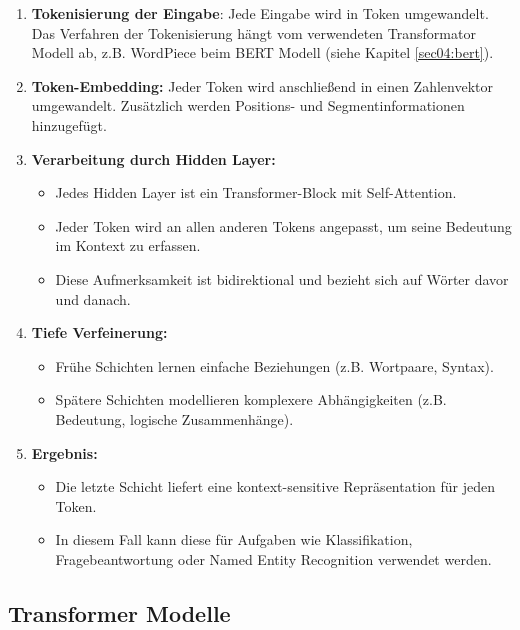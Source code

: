 \begin{enumerate}
    \item \textbf{Tokenisierung der Eingabe}: Jede Eingabe wird in Token umgewandelt. Das Verfahren der Tokenisierung hängt vom verwendeten Transformator Modell ab,
    z.B. WordPiece beim BERT Modell (siehe Kapitel \ref{sec04:bert}).

    \item \textbf{Token-Embedding:} Jeder Token wird anschließend in einen Zahlenvektor umgewandelt. 
    Zusätzlich werden Positions- und Segmentinformationen hinzugefügt.
    
    \item \textbf{Verarbeitung durch Hidden Layer:} 
    \begin{itemize}
        \item Jedes Hidden Layer ist ein Transformer-Block mit Self-Attention.
        \item Jeder Token wird an allen anderen Tokens angepasst, um seine Bedeutung im Kontext zu erfassen.
        \item Diese Aufmerksamkeit ist bidirektional und bezieht sich auf Wörter davor und danach.
    \end{itemize}
    
    \item \textbf{Tiefe Verfeinerung:} 
    \begin{itemize}
        \item Frühe Schichten lernen einfache Beziehungen (z.B. Wortpaare, Syntax).
        \item Spätere Schichten modellieren komplexere Abhängigkeiten (z.B. Bedeutung, logische Zusammenhänge).
    \end{itemize}
    
    \item \textbf{Ergebnis:} 
    \begin{itemize}
        \item Die letzte Schicht liefert eine kontext-sensitive Repräsentation für jeden Token.
        \item In diesem Fall kann diese für Aufgaben wie Klassifikation, Fragebeantwortung oder Named Entity Recognition verwendet werden.
    \end{itemize}
\end{enumerate} 


\subsection{Transformer Modelle}
\label{sec:transformer_modelle}

